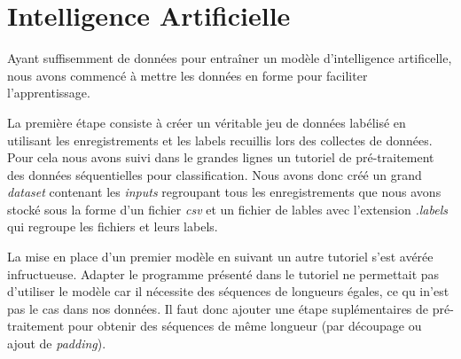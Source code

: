 \section{Intelligence Artificielle}
Ayant suffisemment de données pour entraîner un modèle d'intelligence artificelle, nous avons commencé à mettre les données en forme pour faciliter l'apprentissage.

La première étape consiste à créer un véritable jeu de données labélisé en utilisant les enregistrements et les labels recuillis lors des collectes de données.
Pour cela nous avons suivi dans le grandes lignes un tutoriel de pré-traitement des données séquentielles pour classification.\cite{tuto_1} Nous avons donc créé un grand \textit{dataset} contenant les \textit{inputs} regroupant tous les enregistrements que nous avons stocké sous la forme d'un fichier \textit{csv} et un fichier de lables avec l'extension \textit{.labels} qui regroupe les fichiers et leurs labels.

La mise en place d'un premier modèle en suivant un autre tutoriel s'est avérée infructueuse. Adapter le programme présenté dans le tutoriel ne permettait pas d'utiliser le modèle car il nécessite des séquences de longueurs égales, ce qu in'est pas le cas dans nos données.\cite{tuto_2} Il faut donc ajouter une étape suplémentaires de pré-traitement pour obtenir des séquences de même longueur (par découpage ou ajout de \textit{padding}).